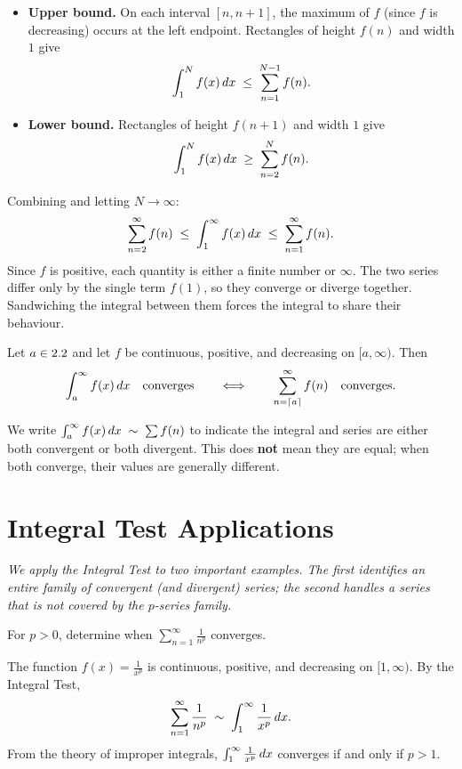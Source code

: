 \begin{itemize}
  \item \textbf{Upper bound.}  On each interval $[n,n+1]$, the maximum of $f$ (since $f$ is decreasing) occurs at the left endpoint.  Rectangles of height $f(n)$ and width $1$ give
  \[
    \int_{1}^{N}f(x)\,dx \;\le\; \sum_{n=1}^{N-1}f(n).
  \]
  \item \textbf{Lower bound.}  Rectangles of height $f(n+1)$ and width $1$ give
  \[
    \int_{1}^{N}f(x)\,dx \;\ge\; \sum_{n=2}^{N}f(n).
  \]
\end{itemize}
Combining and letting $N\to\infty$:
\[
  \sum_{n=2}^{\infty}f(n) \;\le\; \int_{1}^{\infty}f(x)\,dx \;\le\; \sum_{n=1}^{\infty}f(n).
\]
Since $f$ is positive, each quantity is either a finite number or $\infty$.  The two series differ only by the single term $f(1)$, so they converge or diverge together.  Sandwiching the integral between them forces the integral to share their behaviour.

\begin{theorem}
\label{thm:13-7}
Let $a\in2.2$ and let $f$ be continuous, positive, and decreasing on $[a,\infty)$.  Then
\[
  \int_{a}^{\infty}f(x)\,dx \quad\text{converges} \qquad\Longleftrightarrow\qquad \sum_{n=\lceil a\rceil}^{\infty}f(n) \quad\text{converges.}
\]
\end{theorem}

\begin{remark}
We write $\int_{a}^{\infty}f(x)\,dx \;\sim\; \sum f(n)$ to indicate the integral and series are either both convergent or both divergent.  This does \textbf{not} mean they are equal; when both converge, their values are generally different.
\end{remark}

\section{Integral Test Applications}
\label{sec:13.11}

\textit{We apply the Integral Test to two important examples.  The first identifies an entire family of convergent (and divergent) series; the second handles a series that is not covered by the $p$-series family.}

\begin{example}[$p$-series]
\label{ex:13-8}
For $p>0$, determine when $\displaystyle\sum_{n=1}^{\infty}\frac{1}{n^{p}}$ converges.

The function $f(x)=\frac{1}{x^{p}}$ is continuous, positive, and decreasing on $[1,\infty)$.  By the Integral Test,
\[
  \sum_{n=1}^{\infty}\frac{1}{n^{p}} \;\sim\; \int_{1}^{\infty}\frac{1}{x^{p}}\,dx.
\]
From the theory of improper integrals, $\int_{1}^{\infty}\frac{1}{x^{p}}\,dx$ converges if and only if $p>1$.
\end{example}

